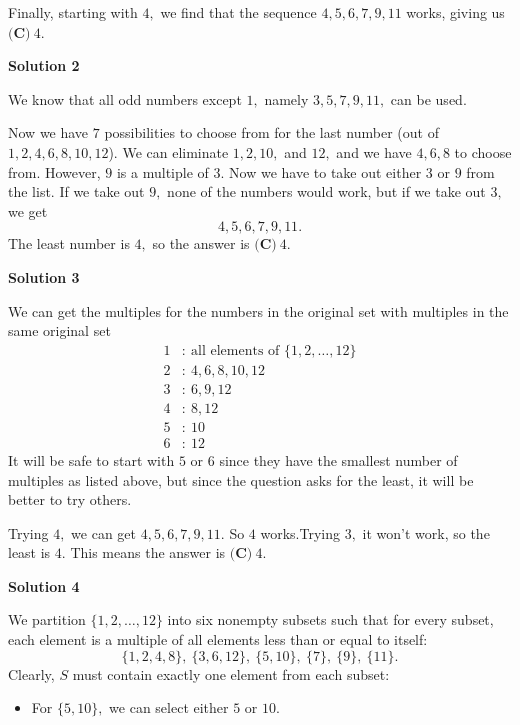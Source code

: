 \begin{enumerate}
 Finally, starting with $4,$ we find that the sequence $4,5,6,7,9,11$ works, giving us $\boxed{\textbf{(C)}\ 4}.$




\textbf{Solution 2}

We know that all odd numbers except $1,$ namely $3, 5, 7, 9, 11,$ can be used.

 Now we have $7$ possibilities to choose from for the last number (out of $1, 2, 4, 6, 8, 10, 12$). We can eliminate $1, 2, 10,$ and $12,$ and we have $4, 6, 8$ to choose from. However, $9$ is a multiple of $3.$ Now we have to take out either $3$ or $9$ from the list. If we take out $9,$ none of the numbers would work, but if we take out $3,$ we get 
 \[4, 5, 6, 7, 9, 11.\]The least number is $4,$ so the answer is $\boxed{\textbf{(C)}\ 4}.$




\textbf{Solution 3}

We can get the multiples for the numbers in the original set with multiples in the same original set
 \begin{align*} 1&: \ \text{all elements of }\{1,2,\dots,12\} \\ 2&: \ 4,6,8,10,12 \\ 3&: \ 6,9,12 \\ 4&: \ 8,12 \\ 5&: \ 10 \\ 6&: \ 12 \end{align*}
It will be safe to start with $5$ or $6$ since they have the smallest number of multiples as listed above, but since the question asks for the least, it will be better to try others.

 Trying $4,$ we can get $4,5,6,7,9,11.$ So $4$ works.Trying $3,$ it won't work, so the least is $4.$ This means the answer is $\boxed{\textbf{(C)}\ 4}.$




\textbf{Solution 4}

We partition $\{1,2,\ldots,12\}$ into six nonempty subsets such that for every subset, each element is a multiple of all elements less than or equal to itself: 
 \[\{1,2,4,8\}, \ \{3,6,12\}, \ \{5,10\}, \ \{7\}, \ \{9\}, \ \{11\}.\]Clearly, $S$ must contain exactly one element from each subset:

 
            \begin{itemize}
        \item For $\{5,10\},$ we can select either $5$ or $10.$
            \end{itemize}
            

\end{enumerate}
